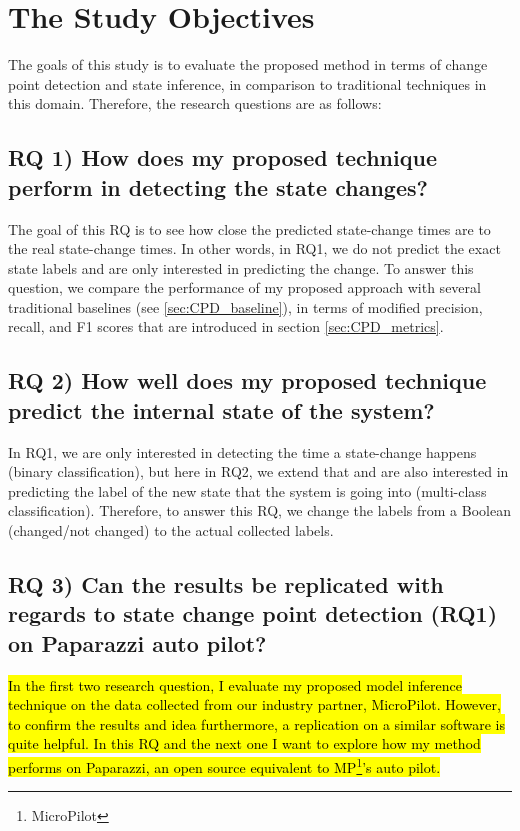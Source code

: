 \section{The Study Objectives}
The goals of this study is to evaluate the proposed method in terms of change point detection and state inference, in comparison to traditional techniques in this domain. Therefore, the research questions are as follows:

\subsection{RQ 1) How does my proposed technique perform in detecting the state changes?}
The goal of this RQ is to see how close the predicted state-change times are to the real state-change times.  In other words, in RQ1, we do not predict the exact state labels and are only interested in predicting the change.
To answer this question, we compare the performance of my proposed approach with several traditional baselines (see \ref{sec:CPD_baseline}), in terms of modified precision, recall, and F1 scores that are introduced in section \ref{sec:CPD_metrics}.


\subsection{RQ 2) How well does my proposed technique predict the internal state of the system?}
In RQ1, we are only interested in detecting the time a state-change happens (binary classification), but here in RQ2, we extend that and are also interested in predicting the label of the new state that the system is going into (multi-class classification).  
Therefore, to answer this RQ, we change the labels from a Boolean (changed/not changed) to the actual collected labels. 

\subsection{RQ 3) Can the results be replicated with regards to state change point detection (RQ1) on Paparazzi auto pilot?}
\hl{In the first two research question, I evaluate my proposed model inference technique on the data collected from our industry partner, MicroPilot. However, to confirm the results and idea furthermore, a replication on a similar software is quite helpful. 
In this RQ and the next one I want to explore how my method performs on Paparazzi, an open source equivalent to MP\footnote{MicroPilot}'s auto pilot.}

